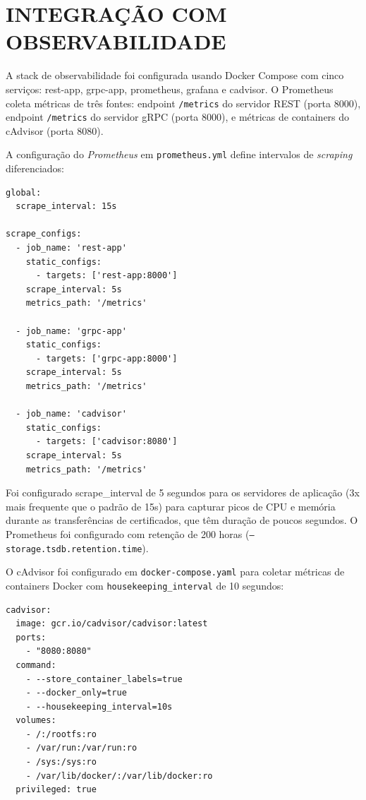 \section{INTEGRAÇÃO COM OBSERVABILIDADE}\label{sec:observabilidade}

A stack de observabilidade foi configurada usando Docker Compose com cinco serviços: rest-app, grpc-app, prometheus, grafana e cadvisor. O Prometheus coleta métricas de três fontes: endpoint \texttt{/metrics} do servidor REST (porta 8000), endpoint \texttt{/metrics} do servidor gRPC (porta 8000), e métricas de containers do cAdvisor (porta 8080).

A configuração do \textit{Prometheus} em \texttt{prometheus.yml} define intervalos de \textit{scraping} diferenciados:

\begin{lstlisting}[caption={Configuração do Prometheus (prometheus.yml)},label=lst:prometheus-config]
global:
  scrape_interval: 15s

scrape_configs:
  - job_name: 'rest-app'
    static_configs:
      - targets: ['rest-app:8000']
    scrape_interval: 5s
    metrics_path: '/metrics'

  - job_name: 'grpc-app'
    static_configs:
      - targets: ['grpc-app:8000']
    scrape_interval: 5s
    metrics_path: '/metrics'

  - job_name: 'cadvisor'
    static_configs:
      - targets: ['cadvisor:8080']
    scrape_interval: 5s
    metrics_path: '/metrics'
\end{lstlisting}

Foi configurado scrape\_interval de 5 segundos para os servidores de aplicação (3x mais frequente que o padrão de 15s) para capturar picos de CPU e memória durante as transferências de certificados, que têm duração de poucos segundos. O Prometheus foi configurado com retenção de 200 horas (\texttt{--storage.tsdb.retention.time}).

O cAdvisor foi configurado em \texttt{docker-compose.yaml} para coletar métricas de containers Docker com \texttt{housekeeping\_interval} de 10 segundos:

\begin{lstlisting}[caption={Configuração do cAdvisor (docker-compose.yaml)},label=lst:cadvisor-config]
cadvisor:
  image: gcr.io/cadvisor/cadvisor:latest
  ports:
    - "8080:8080"
  command:
    - --store_container_labels=true
    - --docker_only=true
    - --housekeeping_interval=10s
  volumes:
    - /:/rootfs:ro
    - /var/run:/var/run:ro
    - /sys:/sys:ro
    - /var/lib/docker/:/var/lib/docker:ro
  privileged: true
\end{lstlisting}

